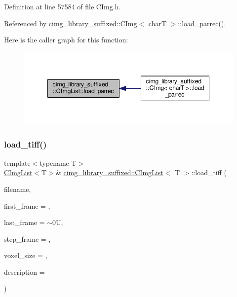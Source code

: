 Definition at line 57584 of file C\+Img.\+h.



Referenced by cimg\+\_\+library\+\_\+suffixed\+::\+C\+Img$<$ char\+T $>$\+::load\+\_\+parrec().

Here is the caller graph for this function\+:
\nopagebreak
\begin{figure}[H]
\begin{center}
\leavevmode
\includegraphics[width=348pt]{d5/d7e/structcimg__library__suffixed_1_1CImgList_affbfd21835dfd5c00fe98cc71c7760c2_icgraph}
\end{center}
\end{figure}
\mbox{\label{structcimg__library__suffixed_1_1CImgList_a2ee1347a41996201ec7dcfcc9b403bdc}} 
\subsubsection{\texorpdfstring{load\+\_\+tiff()}{load\_tiff()}}
{\footnotesize\ttfamily template$<$typename T$>$ \\
\hyperlink{structcimg__library__suffixed_1_1CImgList}{C\+Img\+List}$<$T$>$\& \hyperlink{structcimg__library__suffixed_1_1CImgList}{cimg\+\_\+library\+\_\+suffixed\+::\+C\+Img\+List}$<$ T $>$\+::load\+\_\+tiff (\begin{DoxyParamCaption}\item[{const \hyperlink{classchar}{char} $\ast$const}]{filename,  }\item[{const unsigned int}]{first\+\_\+frame = {},  }\item[{const unsigned int}]{last\+\_\+frame = {\ttfamily $\sim$0U},  }\item[{const unsigned int}]{step\+\_\+frame = {},  }\item[{float $\ast$const}]{voxel\+\_\+size = {},  }\item[{\hyperlink{structcimg__library__suffixed_1_1CImg}{C\+Img}$<$ charT $>$ $\ast$const}]{description = {} }\end{DoxyParamCaption})\hspace{0.3cm}{\ttfamily [inline]}}



